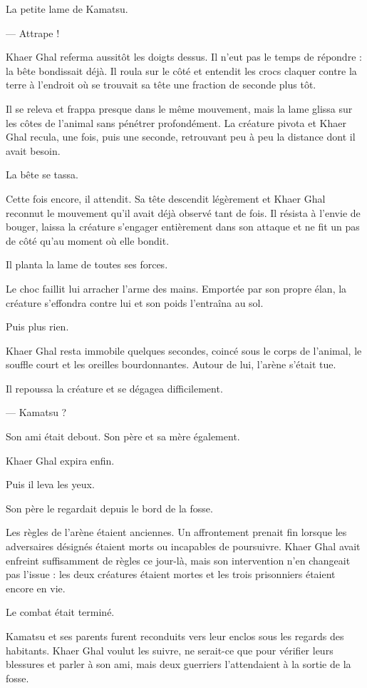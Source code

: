 La petite lame de Kamatsu.

— Attrape !

Khaer Ghal referma aussitôt les doigts dessus. Il n'eut pas le temps de
répondre : la bête bondissait déjà. Il roula sur le côté et entendit les crocs
claquer contre la terre à l'endroit où se trouvait sa tête une fraction de
seconde plus tôt.

Il se releva et frappa presque dans le même mouvement, mais la lame glissa sur
les côtes de l'animal sans pénétrer profondément. La créature pivota et Khaer
Ghal recula, une fois, puis une seconde, retrouvant peu à peu la distance dont
il avait besoin.

La bête se tassa.

Cette fois encore, il attendit. Sa tête descendit légèrement et Khaer Ghal
reconnut le mouvement qu'il avait déjà observé tant de fois. Il résista à
l'envie de bouger, laissa la créature s'engager entièrement dans son attaque et
ne fit un pas de côté qu'au moment où elle bondit.

Il planta la lame de toutes ses forces.

Le choc faillit lui arracher l'arme des mains. Emportée par son propre élan, la
créature s'effondra contre lui et son poids l'entraîna au sol.

Puis plus rien.

Khaer Ghal resta immobile quelques secondes, coincé sous le corps de l'animal,
le souffle court et les oreilles bourdonnantes. Autour de lui, l'arène s'était
tue.

Il repoussa la créature et se dégagea difficilement.

— Kamatsu ?

Son ami était debout. Son père et sa mère également.

Khaer Ghal expira enfin.

Puis il leva les yeux.

Son père le regardait depuis le bord de la fosse.

\scenebreak

Les règles de l'arène étaient anciennes. Un affrontement prenait fin lorsque
les adversaires désignés étaient morts ou incapables de poursuivre. Khaer Ghal
avait enfreint suffisamment de règles ce jour-là, mais son intervention n'en
changeait pas l'issue : les deux créatures étaient mortes et les trois
prisonniers étaient encore en vie.

Le combat était terminé.

Kamatsu et ses parents furent reconduits vers leur enclos sous les regards des
habitants. Khaer Ghal voulut les suivre, ne serait-ce que pour vérifier leurs
blessures et parler à son ami, mais deux guerriers l'attendaient à la sortie de
la fosse.

